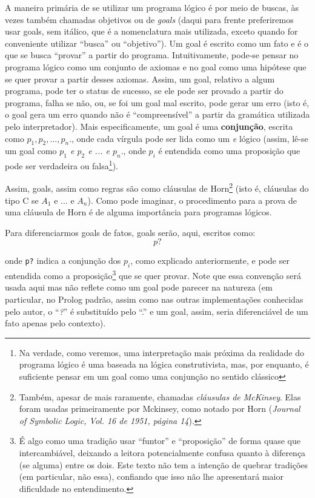 \documentclass{article}
\theoremstyle{remark}
\begin{document}
A maneira primária de se utilizar um programa lógico é por meio de buscas, às vezes também chamadas objetivos ou de \textit{goals} (daqui para frente preferiremos usar goals, sem itálico, que é a nomenclatura mais utilizada, exceto quando for conveniente utilizar ``busca'' ou ``objetivo''). Um goal é escrito como um fato e é o que se busca ``provar'' a partir do programa. Intuitivamente, pode-se pensar no programa lógico como um conjunto de axiomas e no goal como uma hipótese que se quer provar a partir desses axiomas. Assim, um
goal, relativo a algum programa, pode ter o status de sucesso, se ele pode ser provado a partir do programa, falha se não, ou, se foi um goal mal escrito, pode gerar um erro (isto é, o goal gera um erro quando não é ``compreensível'' a partir da gramática utilizada pelo interpretador). Mais especificamente, um goal é uma \textbf{conjunção}, escrita como \textit{$p_1,p_2,...,p_n.$}, onde cada vírgula pode ser lida como um \textit{e} lógico (assim, lê-se um goal como \textit{$p_1$ e $p_2$ e ... e
  $p_n.$}, onde $p_i$ é
entendida como uma proposição que pode ser verdadeira ou falsa\footnote{Na verdade, como veremos, uma interpretação mais próxima da realidade do programa lógico é uma baseada na lógica construtivista, mas, por enquanto, é suficiente pensar em um goal como uma conjunção no sentido clássico}).

Assim, goals, assim como regras são como cláusulas de Horn\footnote{Também, apesar de mais raramente, chamadas \textit{cláusulas de McKinsey}. Elas foram usadas primeiramente por Mckinsey, como notado por Horn (\textit{Journal of Symbolic Logic, Vol. 16 de 1951, página 14}).} (isto é, cláusulas do tipo C se $A_1$ e ... e $A_n$). Como pode imaginar, o procedimento para a prova de uma cláusula de Horn é de alguma importância para programas lógicos.

Para diferenciarmos goals de fatos, goals serão, aqui, escritos como:
\[
  p?
\]

\noindent onde {\tt p?} indica a conjunção dos $p_i$, como explicado anteriormente, e pode ser entendida como a proposição\footnote{É algo como uma tradição usar ``funtor'' e ``proposição'' de forma quase que intercambiável, deixando a leitora potencialmente confusa quanto à diferença (se alguma) entre os dois. Este texto não tem a intenção de quebrar tradições (em particular, não essa), confiando que isso não lhe apresentará maior dificuldade no entendimento.} que se quer provar. Note que essa convenção será usada aqui mas não reflete como um goal pode parecer na natureza (em particular, no
Prolog padrão, assim como nas outras implementações conhecidas pelo autor, o ``\textit{?}'' é substituído pelo ``.'' e um goal, assim, seria diferenciável de um fato apenas pelo contexto).
\end{document}

